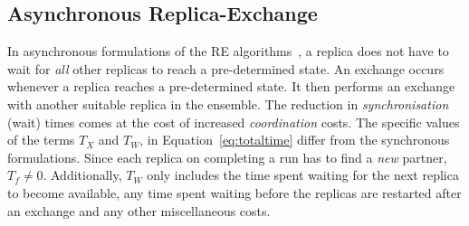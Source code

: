\documentclass{rspublic}
\newcommand{\jhanote}[1]{ {\textcolor{red} { ***shantenu: #1 }}}
\newcommand{\alnote}[1]{ {\textcolor{blue} { ***andre: #1 }}}
\newcommand{\athotanote}[1]{ {\textcolor{green} { ***athota: #1 }}}
\newcommand{\alnote}[1]{}
\newcommand{\athotanote}[1]{}
\newcommand{\jhanote}[1]{}
\begin{document}
\subsection{Asynchronous Replica-Exchange}


In asynchronous formulations of the RE
algorithms~\citep{parashar_arepex,DBLP:journals/jcc/GallicchioLP08}, a
replica does not have to wait for {\it all} other replicas to reach a
pre-determined state. An exchange occurs whenever a replica reaches a
pre-determined state. It then performs an exchange with another suitable
replica in the ensemble.  The reduction in {\it synchronisation}
(wait) times comes at the cost of increased {\it coordination} costs.
The specific values of the terms $T_{X}$ and $T_W$, in
Equation~\ref{eq:totaltime} differ from the synchronous formulations.
Since each replica on completing a run has to find a {\it new}
partner, $T_f \neq 0$.  Additionally, $T_W$ only includes the time
spent waiting for the next replica to become available, any time spent
waiting before the replicas are restarted after an exchange and any
other miscellaneous costs.



\end{document}
